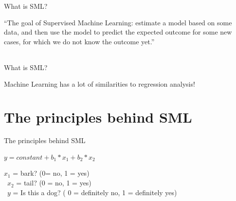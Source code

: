 \documentclass[handout]{beamer}
\begin{document}
	
	\begin{frame}{What is SML?} 
		
		“The goal of Supervised Machine Learning: estimate a model based on some data, and then use the model to predict the expected outcome for some new cases, for which we do not know the outcome yet.” \\\
		
		\begin{tiny}
		\end{tiny}
		
		
		
		
		
	\end{frame}
	
	\begin{frame}{What is SML?} 
		
		Machine Learning has a lot of similarities to regression analysis!
		
		
	\end{frame}
	
	
	\section{The principles behind SML}
	
	\begin{frame}{The principles behind SML} 
		
		\(y = constant + b_1 * x_1 + b_2 * x_2\) 
		
		\(x_1\) = bark? (0= no, 1 = yes) \\\
		\(x_2\) = tail? (0 = no, 1 = yes) \\\
		\(y\) = Is this a dog? ( 0 = definitely no, 1 = definitely yes)
		
		
	\end{frame}
	
\end{document}
